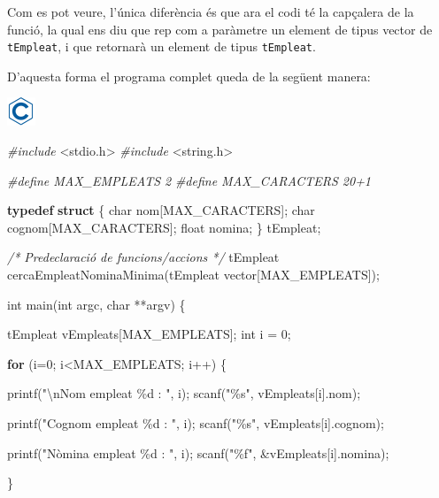 \documentclass[]{book}
\newenvironment{Shaded}{\begin{snugshade}}{\end{snugshade}}
\newcommand{\CommentTok}[1]{\textcolor[rgb]{0.56,0.35,0.01}{\textit{#1}}}
\newcommand{\ControlFlowTok}[1]{\textcolor[rgb]{0.13,0.29,0.53}{\textbf{#1}}}
\newcommand{\DataTypeTok}[1]{\textcolor[rgb]{0.13,0.29,0.53}{#1}}
\newcommand{\DecValTok}[1]{\textcolor[rgb]{0.00,0.00,0.81}{#1}}
\newcommand{\ImportTok}[1]{#1}
\newcommand{\KeywordTok}[1]{\textcolor[rgb]{0.13,0.29,0.53}{\textbf{#1}}}
\newcommand{\NormalTok}[1]{#1}
\newcommand{\PreprocessorTok}[1]{\textcolor[rgb]{0.56,0.35,0.01}{\textit{#1}}}
\newcommand{\SpecialCharTok}[1]{\textcolor[rgb]{0.00,0.00,0.00}{#1}}
\newcommand{\StringTok}[1]{\textcolor[rgb]{0.31,0.60,0.02}{#1}}
\begin{document}
Com es pot veure, l'única diferència és que ara el codi té la capçalera de la funció, la qual ens diu que rep com a paràmetre un element de tipus vector de \texttt{tEmpleat}, i que retornarà un element de tipus \texttt{tEmpleat}.

D'aquesta forma el programa complet queda de la següent manera:

\includegraphics{./img/c.png}

\begin{Shaded}
\begin{Highlighting}[]
\PreprocessorTok{\#include }\ImportTok{\textless{}stdio.h\textgreater{}}
\PreprocessorTok{\#include }\ImportTok{\textless{}string.h\textgreater{}}

\PreprocessorTok{\#define MAX\_EMPLEATS 2}
\PreprocessorTok{\#define MAX\_CARACTERS 20+1}

\KeywordTok{typedef} \KeywordTok{struct}\NormalTok{ \{}
    \DataTypeTok{char}\NormalTok{ nom[MAX\_CARACTERS];}
    \DataTypeTok{char}\NormalTok{ cognom[MAX\_CARACTERS];}
    \DataTypeTok{float}\NormalTok{ nomina;}
\NormalTok{\} tEmpleat;}

\CommentTok{/* Predeclaració de funcions/accions */}
\NormalTok{tEmpleat cercaEmpleatNominaMinima(tEmpleat vector[MAX\_EMPLEATS]);}

\DataTypeTok{int}\NormalTok{ main(}\DataTypeTok{int}\NormalTok{ argc, }\DataTypeTok{char}\NormalTok{ **argv) \{}

\NormalTok{    tEmpleat vEmpleats[MAX\_EMPLEATS];}
    \DataTypeTok{int}\NormalTok{ i = }\DecValTok{0}\NormalTok{;}

    \ControlFlowTok{for}\NormalTok{ (i=}\DecValTok{0}\NormalTok{; i\textless{}MAX\_EMPLEATS; i++) \{}

\NormalTok{        printf(}\StringTok{"}\SpecialCharTok{\textbackslash{}n}\StringTok{Nom empleat \%d : "}\NormalTok{, i);}
\NormalTok{        scanf(}\StringTok{"\%s"}\NormalTok{, vEmpleats[i].nom);}

\NormalTok{        printf(}\StringTok{"Cognom empleat \%d : "}\NormalTok{, i);}
\NormalTok{        scanf(}\StringTok{"\%s"}\NormalTok{, vEmpleats[i].cognom);}

\NormalTok{        printf(}\StringTok{"Nòmina empleat \%d : "}\NormalTok{, i);}
\NormalTok{        scanf(}\StringTok{"\%f"}\NormalTok{, \&vEmpleats[i].nomina);}

\NormalTok{    \}}


\end{Highlighting}
\end{Shaded}
\end{document}
